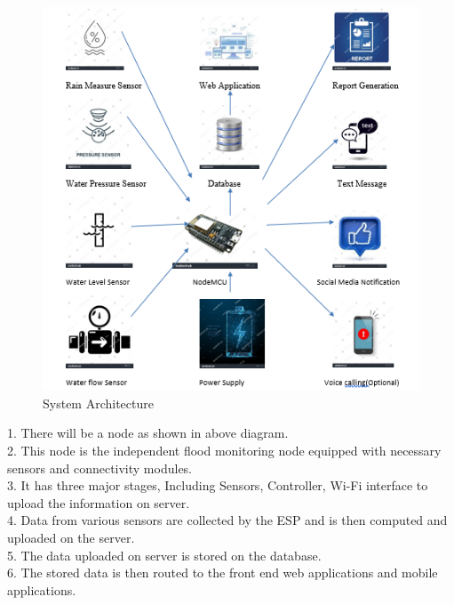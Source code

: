 \documentclass[a4paper,12pt]{report}
\begin{document}
\begin{figure}[H]
  \includegraphics[width=5 in]{d1.png}
  \caption{System Architecture}
  \label{fig:boat1}
\end{figure}


1. There will be a node as shown in above diagram. \\
2. This node is the independent flood monitoring node equipped with necessary sensors and connectivity modules. \\
3. It has three major stages, Including Sensors, Controller, Wi-Fi interface to upload the information on server.\\
 4. Data from various sensors are collected by the ESP and is then computed and uploaded on the server.\\
 5. The data uploaded on server is stored on the database. \\
6. The stored data is then routed to the front end web applications and mobile applications.\\
\end{document}
